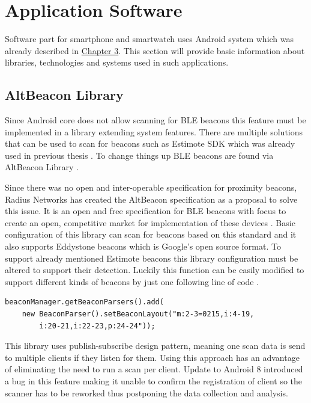 \section{Application Software}\label{sec:ApplicationSoftware}
Software part for smartphone and smartwatch uses Android system which was already described in \hyperref[sec:Android]{Chapter 3}. This section will provide basic information about libraries, technologies and systems used in such applications.

\subsection{AltBeacon Library}\label{subsec:AltBeaconLibrary}
Since Android core does not allow scanning for BLE beacons this feature must be implemented in a library extending system features. There are multiple solutions that can be used to scan for beacons such as Estimote SDK \cite{ESDKfA} which was already used in previous thesis \cite{PMRIL}. To change things up BLE beacons are found via AltBeacon Library \cite{ABL}.

Since there was no open and inter-operable specification for proximity beacons, Radius Networks has created the AltBeacon specification as a proposal to solve this issue. It is an open and free specification for BLE beacons with focus to create an open, competitive market for implementation of these devices \cite{AltB}. Basic configuration of this library can scan for beacons based on this standard and it also supports Eddystone beacons which is Google's open source format. To support already mentioned Estimote beacons this library configuration must be altered to support their detection. Luckily this function can be easily modified to support different kinds of beacons by just one following line of code \cite{ABL, EDDF}.

\begin{lstlisting}[caption=Code to enable all beacon types]
beaconManager.getBeaconParsers().add(
	new BeaconParser().setBeaconLayout("m:2-3=0215,i:4-19,
		i:20-21,i:22-23,p:24-24"));
\end{lstlisting}

This library uses publish-subscribe design pattern, meaning one scan data is send to multiple clients if they listen for them. Using this approach has an advantage of eliminating the need to run a scan per client. Update to Android 8 introduced a bug in this feature making it unable to confirm the registration of client so the scanner has to be reworked thus postponing the data collection and analysis.


